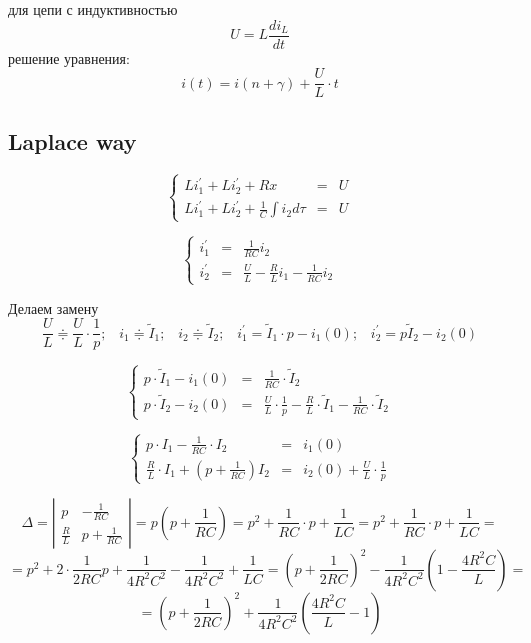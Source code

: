 \documentclass[a4paper,12pt]{article}
\begin{document}
для цепи с индуктивностью 
$$
U = L\frac{d i_L}{dt} 
$$
решение уравнения:
$$
i(t) = i(n+\gamma) + \frac{U}{L}\cdot t
$$


\subsection{Laplace way}

$$
\left\{
\begin{array}{lcl}
	Li_1^\prime + L i_2^\prime + Rx &=& U\\[1.5mm]
	Li_1^\prime + L i_2^\prime + \frac{1}{C}\int i_2 d\tau &=& U
\end{array}
\right.
$$

$$
\left\{
\begin{array}{lcl}
	i_1^\prime &=& \frac{1}{RC} i_2\\[1.5mm]
	i_2^\prime &=& \frac{U}{L} - \frac{R}{L} i_1 - \frac{1}{RC} i_2
\end{array}
\right.
$$

Делаем замену
$$
\frac{U}{L} \doteqdot \frac{U}{L} \cdot \frac{1}{p};\; \; \; i_1 \doteqdot \tilde{I}_1 ;\; \; \; i_2 \doteqdot \tilde{I}_2; \; \; \;
i_1^\prime = \tilde{I}_1\cdot p - i_1(0); \; \; \;  i_2^\prime = p \tilde{I}_2 - i_2(0)
$$

$$
\left\{
	\begin{array}{lcl}
		p\cdot \tilde{I}_1 - i_1(0) &=& \frac{1}{RC} \cdot \tilde{I}_2\\[1.5mm]
		p\cdot \tilde{I}_2 - i_2(0) &=& \frac{U}{L}\cdot \frac{1}{p} - \frac{R}{L}\cdot \tilde{I}_1 -  \frac{1}{RC} \cdot \tilde{I}_2
	\end{array}
\right.
$$

$$
\left\{
\begin{array}{lcl}
	p\cdot I_1 - \frac{1}{RC}\cdot I_2& =& i_1(0)\\[1.5mm]
	\frac{R}{L}\cdot I_1 + \left( p + \frac{1}{RC}\right) I_2 &=& i_2(0) + \frac{U}{L}\cdot \frac{1}{p}
\end{array}
\right.
$$

$$
\Delta = \left| 
\begin{array}{cc} p          & -\frac{1}{RC} \\[1.5mm]
	\frac{R}{L} & p + \frac{1}{RC}
\end{array}\right| =
p\left(p + \frac{1}{RC}\right) = p^2 + \frac{1}{RC}\cdot p + \frac{1}{LC}=
p^2 +\frac{1}{RC}\cdot p + \frac{1}{LC} =
$$
$$
=p^2 + 2\cdot\frac{1}{2RC}p + \frac{1}{4R^2C^2} - \frac{1}{4R^2C^2} + \frac{1}{LC} =
\left(p+\frac{1}{2RC}\right)^2 - \frac{1}{4R^2C^2} \left( 1 - \frac{4R^2C}{L}\right) =
$$
$$
=\left(p + \frac{1}{2RC}\right)^2 + \frac{1}{4R^2C^2}\left(\frac{4R^2C}{L}-1\right)
$$
\end{document}
